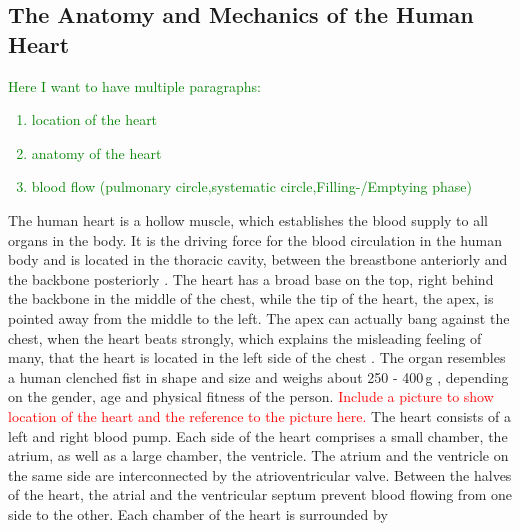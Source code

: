 \subsection{The Anatomy and Mechanics of the Human Heart}
\label{anatomy}
\textcolor{green}{
	Here I want to have multiple paragraphs:
	\begin{enumerate}
  		\item location of the heart  
  		\item anatomy of the heart
  		\item blood flow (pulmonary circle,systematic circle,Filling-/Emptying phase)
	\end{enumerate}
}
The human heart is a hollow muscle, which establishes the blood supply to all organs in the body. It is the driving force for the blood circulation in the human body and is located in the thoracic cavity, between the breastbone anteriorly and the backbone posteriorly \cite{sherwood07}. The heart has a broad base on the top, right behind the backbone in the middle of the chest, while the tip of the heart, the apex, is pointed away from the middle to the left. The apex can actually bang against the chest, when the heart beats strongly, which explains the misleading feeling of many, that the heart is located in the left side of the chest \cite{sherwood07}. The organ resembles a human clenched fist in shape and size and weighs about 250 - 400\,g \cite{schwegler11}, depending on the gender, age and physical fitness of the person. \textcolor{red}{Include a picture to show location of the heart and the reference to the picture here.} \newline
The heart consists of a left and right blood pump. Each side of the heart comprises a small chamber, the atrium, as well as a large chamber, the ventricle. The atrium and the ventricle on the same side are interconnected by the atrioventricular valve. Between the halves of the heart, the atrial and the ventricular septum prevent blood flowing from one side to the other. Each chamber of the heart is surrounded by  




